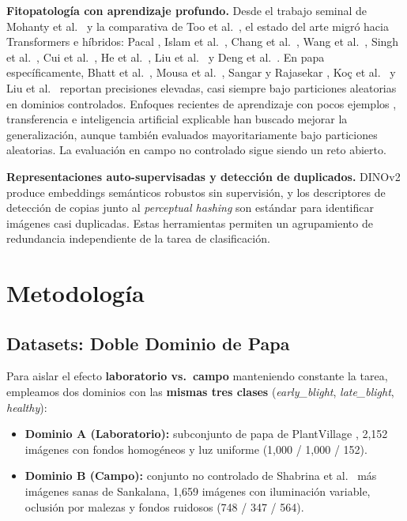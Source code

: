 \documentclass[journal,compsoc]{IEEEtran}
\begin{document}
\textbf{Fitopatología con aprendizaje profundo.} Desde el trabajo seminal de Mohanty et al.\ \cite{mohanty2016using} y la comparativa de Too et al.\ \cite{too2019comparative}, el estado del arte migró hacia Transformers e híbridos: Pacal \cite{pacal2024enhancing}, Islam et al.\ \cite{islam2025plant}, Chang et al.\ \cite{chang2024edge}, Wang et al.\ \cite{wang2024pdtr}, Singh et al.\ \cite{singh2024vitgan}, Cui et al.\ \cite{cui2024plant}, He et al.\ \cite{he2025stcfi}, Liu et al.\ \cite{liu2024wasserstein} y Deng et al.\ \cite{deng2025efficient}. En papa específicamente, Bhatt et al.\ \cite{potatoxai2024}, Mousa et al.\ \cite{mousa2025potato}, Sangar y Rajasekar \cite{sangar2025optimized}, Koç et al.\ \cite{koc2024potato} y Liu et al.\ \cite{liu2025lightweight} reportan precisiones elevadas, casi siempre bajo particiones aleatorias en dominios controlados. Enfoques recientes de aprendizaje con pocos ejemplos \cite{rezaei2024fewshot, abutaleb2024transformer}, transferencia \cite{joshi2025transfer} e inteligencia artificial explicable \cite{ramesh2024explainable} han buscado mejorar la generalización, aunque también evaluados mayoritariamente bajo particiones aleatorias. La evaluación en campo no controlado \cite{shabrina2024uncontrolled, thapa2025plant, singh2020plantdoc, moupojou2023fieldplant} sigue siendo un reto abierto.

\textbf{Representaciones auto-supervisadas y detección de duplicados.} DINOv2 \cite{oquab2024dinov2} produce embeddings semánticos robustos sin supervisión, y los descriptores de detección de copias \cite{pizzi2022sscd} junto al \textit{perceptual hashing} \cite{zauner2010phash} son estándar para identificar imágenes casi duplicadas. Estas herramientas permiten un agrupamiento de redundancia independiente de la tarea de clasificación.

\section{Metodología}

\subsection{Datasets: Doble Dominio de Papa}
Para aislar el efecto \textbf{laboratorio vs.\ campo} manteniendo constante la tarea, empleamos dos dominios con las \textbf{mismas tres clases} (\textit{early\_blight}, \textit{late\_blight}, \textit{healthy}):
\begin{itemize}
\item \textbf{Dominio A (Laboratorio):} subconjunto de papa de PlantVillage \cite{hughes2015open}, 2{,}152 imágenes con fondos homogéneos y luz uniforme (1{,}000 / 1{,}000 / 152).
\item \textbf{Dominio B (Campo):} conjunto no controlado de Shabrina et al.\ \cite{shabrina2024uncontrolled} más imágenes sanas de Sankalana, 1{,}659 imágenes con iluminación variable, oclusión por malezas y fondos ruidosos (748 / 347 / 564).
\end{itemize}
\end{document}
